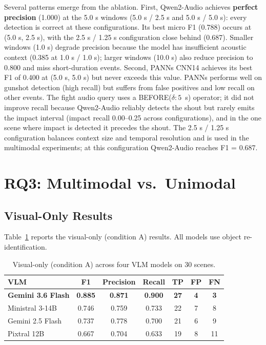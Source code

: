 Several patterns emerge from the ablation. First, Qwen2-Audio achieves \textbf{perfect precision} (1.000) at the 5.0 s windows (5.0 s / 2.5 s and 5.0 s / 5.0 s): every detection is correct at these configurations. Its best micro F1 (0.788) occurs at (5.0 s, 2.5 s), with the 2.5 s / 1.25 s configuration close behind (0.687). Smaller windows (1.0 s) degrade precision because the model has insufficient acoustic context (0.385 at 1.0 s / 1.0 s); larger windows (10.0 s) also reduce precision to 0.800 and miss short-duration events. Second, PANNs CNN14 achieves its best F1 of 0.400 at (5.0 s, 5.0 s) but never exceeds this value. PANNs performs well on gunshot detection (high recall) but suffers from false positives and low recall on other events. The fight audio query uses a BEFORE($\delta:5$~s) operator; it did not improve recall because Qwen2-Audio reliably detects the shout but rarely emits the impact interval (impact recall 0.00--0.25 across configurations), and in the one scene where impact is detected it precedes the shout. The 2.5 s / 1.25 s configuration balances context size and temporal resolution and is used in the multimodal experiments; at this configuration Qwen2-Audio reaches F1 = 0.687.

\section{RQ3: Multimodal vs.\ Unimodal}
\label{sec:rq3}

\subsection{Visual-Only Results}

Table~\ref{tab:vlm_comparison} reports the visual-only (condition A) results. All models use object re-identification.

\begin{table}[h]
  \centering
  \caption{Visual-only (condition A) across four VLM models on 30 scenes.}
  \label{tab:vlm_comparison}
  \begin{tabular}{lcccccc}
    \toprule
    VLM & F1 & Precision & Recall & TP & FP & FN \\
    \midrule
     \textbf{Gemini 3.6 Flash} & \textbf{0.885} & \textbf{0.871} & \textbf{0.900} & \textbf{27} & \textbf{4} & \textbf{3} \\
     Ministral 3-14B & 0.746 & 0.759 & 0.733 & 22 & 7 & 8 \\
     Gemini 2.5 Flash & 0.737 & 0.778 & 0.700 & 21 & 6 & 9 \\
     Pixtral 12B & 0.667 & 0.704 & 0.633 & 19 & 8 & 11 \\
    \bottomrule
  \end{tabular}
\end{table}

